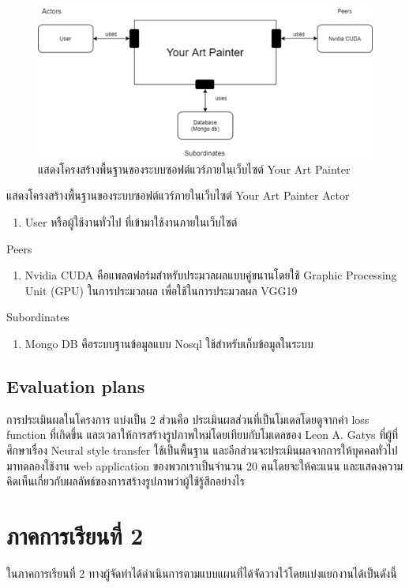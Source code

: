 \documentclass[12pt,oneside,openright,a4paper]{cpe-thai-project}
\begin{document}
\begin{figure}[!h]
  \centering
  \includegraphics[width=14cm]{./image/ArchDesign.png}
  \caption{แสดงโครงสร้างพื้นฐานของระบบซอฟต์แวร์ภายในเว็บไซต์ Your Art Painter}
  \label{fig:ArchDesign}
\end{figure}
แสดงโครงสร้างพื้นฐานของระบบซอฟต์แวร์ภายในเว็บไซต์ Your Art Painter \newline
Actor
\begin{enumerate}
  \item User หรือผู้ใช้งานทั่วไป ที่เข้ามาใช้งานภายในเว็บไซต์ 
\end{enumerate}
Peers 
\begin{enumerate}
  \item Nvidia CUDA คือแพลตฟอร์มสำหรับประมวลผลแบบคู่ขนานโดยใช้ Graphic Processing Unit (GPU) ในการประมวลผล เพื่อใช้ในการประมวลผล VGG19
\end{enumerate}
Subordinates
\begin{enumerate}
  \item Mongo DB คือระบบฐานข้อมูลแบบ Nosql ใช้สำหรับเก็บข้อมูลในระบบ
\end{enumerate}

\subsection{Evaluation plans}
การประเมินผลในโครงการ แบ่งเป็น 2 ส่วนคือ ประเมินผลส่วนที่เป็นโมเดลโดยดูจากค่า loss function ที่เกิดขึ้น และเวลาให้การสร้างรูปภาพใหม่โดยเทียบกับโมเดลของ Leon A. Gatys ที่ผู้ที่ศึกษาเรื่อง Neural style transfer ใช้เป็นพื้นฐาน และอีกส่วนจะประเมินผลจากการให้บุคคลทั่วไปมาทดลองใช้งาน web application ของพวกเราเป็นจำนวน 20 คนโดยจะให้คะแนน และแสดงความคิดเห็นเกี่ยวกับผลลัพธ์ของการสร้างรูปภาพว่าผู้ใช้รู้สึกอย่างไร  

\newpage



\section{ภาคการเรียนที่ 2}
\par\setlength{\parindent}{5ex}
ในภาคการเรียนที่ 2 ทางผู้จัดทำได้ดำเนินการตามแบบแผนที่ได้จัดวางไว้โดยแบ่งแยกงานได้เป็นดังนี้
\end{document}
